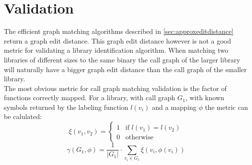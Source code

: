 \documentclass[
    12pt,                               %
    DIV=14,                     %
    parskip=half+,              %
    bigheadings,                %
    cleardoubleempty,   %
    halfparskip,                %
    ]{scrreprt} %
\begin{document}
\chapter{Validation} \label{chap:validation}
The efficient graph matching algorithms described in \ref{sec:approxeditdistance} return a graph edit distance. This graph edit distance however is not a good metric for validating a library identification algorithm. When matching two libraries of different sizes to the same binary the call graph of the larger library will naturally have a bigger graph edit distance than the call graph of the smaller library. \\
The most obvious metric for call graph matching validation is the factor of functions correctly mapped. For a library, with call graph $G_1$, with known symbols returned by the labeling function $l(v_i)$ and a mapping $\phi$ the metric can be calulated:
\begin{equation}
\xi(v_1, v_2) = \begin{cases}
		1 & \text{if } l(v_1) = l(v_2) \\
		0 & \text{otherwise}
	\end{cases}
\end{equation}
\begin{equation}
\gamma(G_1, \phi) = \frac{1}{|G_1|} \cdot \sum_{v_i \in G_1} \xi(v_i, \phi(v_i))
\end{equation}
\end{document}

